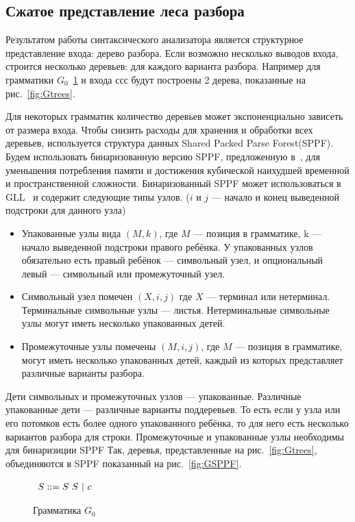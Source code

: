 \documentclass[14pt]{matmex-diploma-custom}
\begin{document}
	\subsection{Сжатое представление леса разбора}
	Результатом работы синтаксического анализатора является структурное представление
    входа: дерево разбора. Если возможно несколько выводов входа, строится несколько деревьев:
    для каждого варианта разбора. Например для грамматики $G_0$~\ref{fig:fig0} и входа $ссс$
    будут построены 2 дерева, показанные на рис.~\ref{fig:Gtrees}.
    
    Для некоторых грамматик количество деревьев может экспоненциально зависеть от размера входа.
    Чтобы снизить расходы для хранения и обработки всех деревьев, используется структура данных
    Shared Packed Parse Forest(SPPF). 
    Будем использовать бинаризованную версию SPPF, предложенную в~\cite{brnglr}, для уменьшения
    потребления памяти и достижения кубической наихудшей временной и пространственной сложности.
    Бинаризованный SPPF может использоваться в GLL~\cite{scott2013gll} и содержит следующие типы узлов.
    ($i$ и $j$ --- начало и конец выведенной подстроки для данного узла) 
    \begin{itemize}
        \item Упакованные узлы вида $(M, k)$, где $M$ --- позиция в грамматике, k --- начало выведенной
        подстроки правого ребёнка. У упакованных узлов обязательно есть правый ребёнок ---
        символьный узел, и опциональный левый --- символьный или промежуточный узел.
        \item Символьный узел помечен $(X, i, j)$ где $X$ --- терминал или нетерминал.
        Терминальные символьные узлы --- листья. 
        Нетерминальные символьные узлы могут иметь несколько упакованных детей. 
        \item Промежуточные узлы помечены $ (M, i, j) $, где $M$ --- позиция в грамматике, 
        могут иметь несколько упакованных детей, каждый из которых представляет различные варианты разбора.
    \end{itemize}
    Дети символьных и промежуточных узлов --- упакованные. Различные упакованные дети --- различные варианты поддеревьев.
    То есть если у узла или его потомков есть более одного упакованного ребёнка, то для него есть несколько вариантов 
    разбора для строки. Промежуточные и упакованные узлы необходимы для бинаризиции SPPF
    Так, деревья, представленные на рис.~\ref{fig:Gtrees}, объединяются в SPPF показанный на рис.~\ref{fig:GSPPF}.
    \begin{figure}
        \centering
        $
        \begin{array}[b]{rl}
        S ::= S\ S\ | \ c \ \ \ 
        \end{array}
        $
        \caption{Грамматика $G_0$}
        \label{fig:fig0}
    \end{figure}
\end{document}

